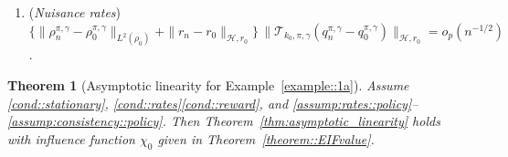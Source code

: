 \documentclass[12pt]{article}
\theoremstyle{plain}
\newtheorem{theorem}{Theorem}
\begin{document}
\begin{enumerate}[label=\textbf{(E\arabic*)}, ref=E\arabic*, series = efficiency1a]
  
    
    \item \label{assump:rates::policy} (\textit{Nuisance rates}) 
    $\bigl\{\|\rho_n^{\pi,\gamma} - \rho_0^{\pi,\gamma}\|_{L^2(\rho_0)} 
      + \|r_n - r_0\|_{\mathcal{H},r_0}\bigr\}\,
    \bigl\|
        \mathcal{T}_{k_0,\pi,\gamma}(q_n^{\pi,\gamma} - q_0^{\pi,\gamma})
    \bigr\|_{\mathcal{H},r_0}
    = o_p(n^{-1/2})$.
\end{enumerate}


 
\begin{theorem}[Asymptotic linearity for Example~\ref{example::1a}]
\label{theorem::ALex1}
Assume \ref{cond::stationary}, \ref{cond::rates}\ref{cond::reward}, and
\ref{assump:rates::policy}--\ref{assump:consistency::policy}.  
Then Theorem~\ref{thm:asymptotic_linearity} holds with influence function
$\chi_0$ given in Theorem~\ref{theorem::EIFvalue}.
\end{theorem}
\end{document}
